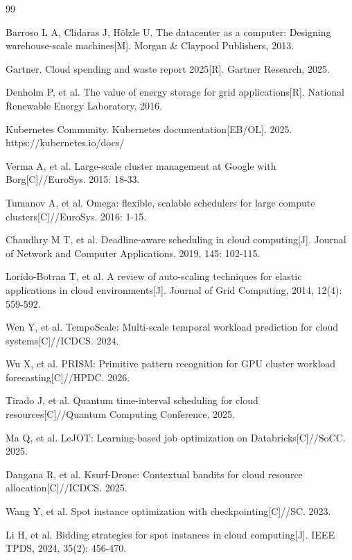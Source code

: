 \documentclass[10pt,a4paper]{article}
\begin{document}

\begin{thebibliography}{99}

Barroso L A, Clidaras J, Hölzle U. The datacenter as a computer: Designing warehouse-scale machines[M]. Morgan \& Claypool Publishers, 2013.

Gartner. Cloud spending and waste report 2025[R]. Gartner Research, 2025.

Denholm P, et al. The value of energy storage for grid applications[R]. National Renewable Energy Laboratory, 2016.

Kubernetes Community. Kubernetes documentation[EB/OL]. 2025. https://kubernetes.io/docs/

Verma A, et al. Large-scale cluster management at Google with Borg[C]//EuroSys. 2015: 18-33.

Tumanov A, et al. Omega: flexible, scalable schedulers for large compute clusters[C]//EuroSys. 2016: 1-15.

Chaudhry M T, et al. Deadline-aware scheduling in cloud computing[J]. Journal of Network and Computer Applications, 2019, 145: 102-115.

Lorido-Botran T, et al. A review of auto-scaling techniques for elastic applications in cloud environments[J]. Journal of Grid Computing, 2014, 12(4): 559-592.

Wen Y, et al. TempoScale: Multi-scale temporal workload prediction for cloud systems[C]//ICDCS. 2024.

Wu X, et al. PRISM: Primitive pattern recognition for GPU cluster workload forecasting[C]//HPDC. 2026.

Tirado J, et al. Quantum time-interval scheduling for cloud resources[C]//Quantum Computing Conference. 2025.

Ma Q, et al. LeJOT: Learning-based job optimization on Databricks[C]//SoCC. 2025.

Dangana R, et al. Ksurf-Drone: Contextual bandits for cloud resource allocation[C]//ICDCS. 2025.

Wang Y, et al. Spot instance optimization with checkpointing[C]//SC. 2023.

Li H, et al. Bidding strategies for spot instances in cloud computing[J]. IEEE TPDS, 2024, 35(2): 456-470.


\end{thebibliography}
\end{document}
